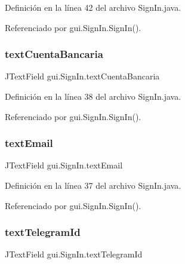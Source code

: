 Definición en la línea 42 del archivo Sign\+In.\+java.



Referenciado por gui.\+Sign\+In.\+Sign\+In().

\mbox{\label{classgui_1_1_sign_in_a8a864d56fe9adba78e852b99fabf7e57}} 
\subsubsection{\texorpdfstring{textCuentaBancaria}{textCuentaBancaria}}
{\footnotesize\ttfamily J\+Text\+Field gui.\+Sign\+In.\+text\+Cuenta\+Bancaria\hspace{0.3cm}{\ttfamily [private]}}



Definición en la línea 38 del archivo Sign\+In.\+java.



Referenciado por gui.\+Sign\+In.\+Sign\+In().

\mbox{\label{classgui_1_1_sign_in_a4aa7ecbf60495c3f44fba7979783990a}} 
\subsubsection{\texorpdfstring{textEmail}{textEmail}}
{\footnotesize\ttfamily J\+Text\+Field gui.\+Sign\+In.\+text\+Email\hspace{0.3cm}{\ttfamily [private]}}



Definición en la línea 37 del archivo Sign\+In.\+java.



Referenciado por gui.\+Sign\+In.\+Sign\+In().

\mbox{\label{classgui_1_1_sign_in_a9162a721d6af763ff401522b6749cd88}} 
\subsubsection{\texorpdfstring{textTelegramId}{textTelegramId}}
{\footnotesize\ttfamily J\+Text\+Field gui.\+Sign\+In.\+text\+Telegram\+Id\hspace{0.3cm}{\ttfamily [private]}}



